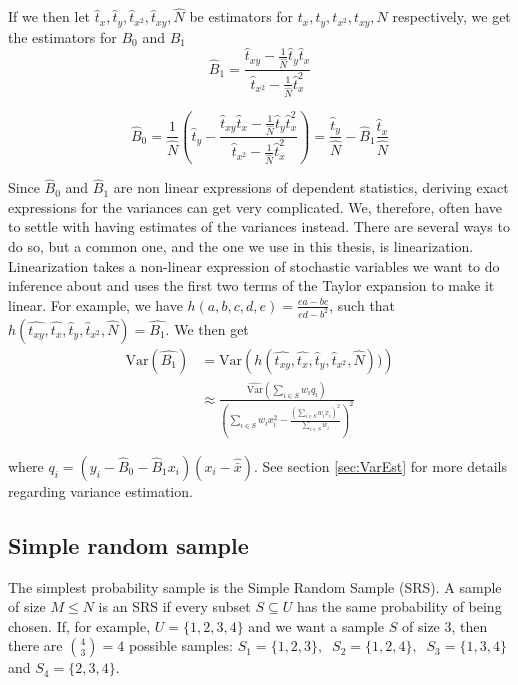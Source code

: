 \documentclass{article}
\begin{document}
If we then let \(\hat{t}_x, \hat{t}_y, \hat{t}_{x^2}, \hat{t}_{xy}, \hat{N}\) be estimators
for \(t_x, t_y, t_{x^2},
t_{xy}, N\) respectively, we get the estimators for \(B_0\) and \(B_1\)
\begin{equation*}
 \hat{B}_1 = \frac{\hat{t}_{xy} - \frac{1}{\widehat{N}} \hat{t}_y \hat{t}_x}
   {\hat{t}_{x^2} - \frac{1}{\widehat{N}} \hat{t}_x^2}
\end{equation*}

\begin{equation*}
 \hat{B}_0 = \frac{1}{\widehat{N}} \left( \hat{t}_y - \frac{\hat{t}_{xy} \hat{t}_x - \frac{1}{\widehat{N}} \hat{t}_y \hat{t}_x^2}
   {\hat{t}_{x^2} - \frac{1}{\widehat{N}} \hat{t}_x^2}
 \right)
 = \frac{\hat{t}_y}{\hat{N}} - \hat{B}_1\frac{\hat{t}_x}{\hat{N}}
\end{equation*}

Since \(\hat{B}_0\) and \(\hat{B}_1\) are non linear expressions of dependent
statistics, deriving exact expressions for the variances can get very complicated. We, therefore,
often have to settle with having estimates of the variances instead.
There are several ways to do so, but a common one,
and the one we use in this thesis, is linearization. Linearization takes a
non-linear expression of stochastic variables we want to do inference about and uses
the first two terms of the Taylor expansion to make it linear.
For example, we have \(h(a, b, c, d, e) = \frac{ea - bc}{ed - b^2}\), such that
\(h(\hat{t_{xy}}, \hat{t_x}, \hat{t}_y, \hat{t}_{x^2}, \hat{N}) = \hat{B_1}\).
We then get
\begin{align*}
 \mathrm{Var}(\hat{B_1})
 &= \mathrm{Var} \left( h(\hat{t_{xy}}, \hat{t_x},
 \hat{t}_y, \hat{t}_{x^2}, \hat{N})) \right) \\
 &\approx \frac{\widehat{\mathrm{Var}}\left( \sum_{i \in S} w_i q_i \right)}
   {\left( \sum_{i \in S} w_i x_i^2 - \frac{\left( \sum_{i \in S} w_i x_i \right)^2}{\sum_{i \in S} w_i} \right)^2}
\end{align*}

where \(q_i = (y_i - \hat{B}_0 - \hat{B}_1 x_i)(x_i - \hat{\bar{x}})\). See
section \ref{sec:VarEst} for more details regarding variance estimation.

\subsection{Simple random sample} \label{sec:SRS}

The simplest probability sample is the Simple Random Sample (SRS). A
sample of size \(M \leq N\) is an SRS if every subset \(S \subseteq U\) has the same
probability of being chosen.
If, for example, \(U = \{1, 2, 3, 4\}\) and we want a sample \(S\) of
size \(3\), then there are \(\binom{4}{3} = 4\)  possible samples:
\( S_1 = \{1, 2, 3\},\ \)
\( S_2 = \{1, 2, 4\},\ \)
\( S_3 = \{1, 3, 4\}\ \) and
\( S_4 = \{2, 3, 4\} \).
\end{document}
